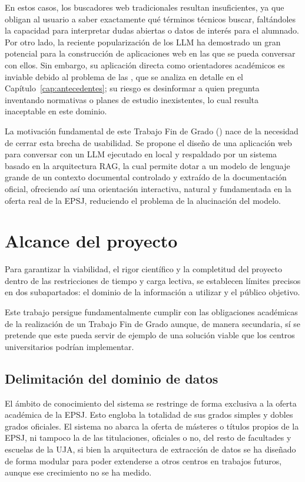 En estos casos, los buscadores web tradicionales resultan insuficientes, ya que obligan al usuario a saber exactamente qué términos técnicos buscar, faltándoles la capacidad para interpretar dudas abiertas o datos de interés para el alumnado. Por otro lado, la reciente popularización de los LLM ha demostrado un gran potencial para la construcción de aplicaciones web en las que se pueda conversar con ellos. Sin embargo, su aplicación directa como orientadores académicos es inviable debido al problema de las , que se analiza en detalle en el Capítulo~\ref{cap:antecedentes}; su riesgo es desinformar a quien pregunta inventando normativas o planes de estudio inexistentes, lo cual resulta inaceptable en este dominio.

La motivación fundamental de este Trabajo Fin de Grado () nace de la necesidad de cerrar esta brecha
de usabilidad. Se propone el diseño de una aplicación web para conversar con un LLM ejecutado en local y respaldado por un sistema basado en la arquitectura RAG, la cual permite dotar a un modelo de lenguaje grande de un contexto documental controlado y extraído de la documentación oficial, ofreciendo así una orientación interactiva, natural y fundamentada en la oferta real de la EPSJ, reduciendo el problema de la alucinación del modelo.


\section{Alcance del proyecto}
\label{secc:alcance}

Para garantizar la viabilidad, el rigor científico y la completitud del proyecto dentro de las restricciones de tiempo y carga lectiva, se establecen límites precisos en dos subapartados: el dominio de la información a utilizar y el público objetivo.

Este trabajo persigue fundamentalmente cumplir con las obligaciones académicas de la realización de un Trabajo Fin de Grado aunque, de manera secundaria, sí se pretende que este pueda servir de ejemplo de una solución viable que los centros universitarios podrían implementar.

\subsection{Delimitación del dominio de datos}

El ámbito de conocimiento del sistema se restringe de forma exclusiva a la oferta académica de la EPSJ. Esto engloba la totalidad de sus grados simples y dobles grados oficiales. El sistema no abarca la oferta de másteres o títulos propios de la EPSJ, ni tampoco la de las titulaciones, oficiales o no, del resto de facultades y escuelas de la UJA, si bien la arquitectura de extracción de datos se ha diseñado de forma modular para poder extenderse a otros centros en trabajos futuros, aunque ese crecimiento no se ha medido.

